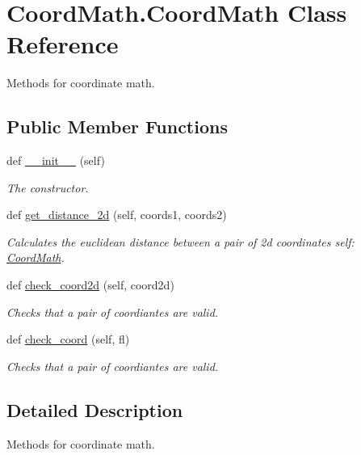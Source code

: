 \hypertarget{classCoordMath_1_1CoordMath}{}\section{Coord\+Math.\+Coord\+Math Class Reference}
\label{classCoordMath_1_1CoordMath}


Methods for coordinate math.  


\subsection*{Public Member Functions}
\begin{DoxyCompactItemize}
\item 
def \hyperlink{classCoordMath_1_1CoordMath_a8667d55c1b0fa08f62506ff7fab886da}{\+\_\+\+\_\+init\+\_\+\+\_\+} (self)
\begin{DoxyCompactList}\small\item\em The constructor. \end{DoxyCompactList}\item 
def \hyperlink{classCoordMath_1_1CoordMath_a74cc0e28ecefcbab5481cdc3fdcc9561}{get\+\_\+distance\+\_\+2d} (self, coords1, coords2)
\begin{DoxyCompactList}\small\item\em Calculates the euclidean distance between a pair of 2d coordinates  self\+: \hyperlink{classCoordMath_1_1CoordMath}{Coord\+Math}. \end{DoxyCompactList}\item 
def \hyperlink{classCoordMath_1_1CoordMath_a49b075576d09bad607669194c9010f27}{check\+\_\+coord2d} (self, coord2d)
\begin{DoxyCompactList}\small\item\em Checks that a pair of coordiantes are valid. \end{DoxyCompactList}\item 
def \hyperlink{classCoordMath_1_1CoordMath_a3d580c26997a545b92b672ccd8497a07}{check\+\_\+coord} (self, fl)
\begin{DoxyCompactList}\small\item\em Checks that a pair of coordiantes are valid. \end{DoxyCompactList}\end{DoxyCompactItemize}


\subsection{Detailed Description}
Methods for coordinate math. 



